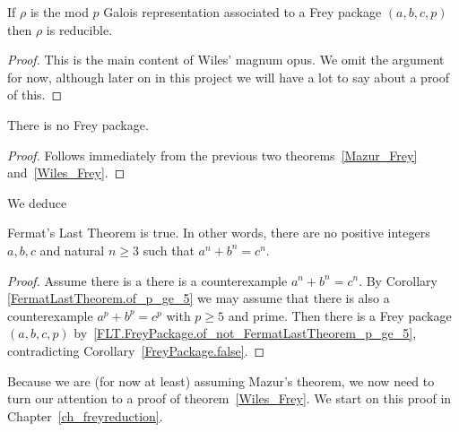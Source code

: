 \begin{theorem}
  \label{Wiles_Frey}
  \leanok
  If $\rho$ is the mod $p$ Galois representation associated to a Frey package $(a,b,c,p)$ then
  $\rho$ is reducible.
\end{theorem}
\begin{proof}
  This is the main content of Wiles' magnum opus.
  We omit the argument for now, although later on in this project
  we will have a lot to say about a proof of this.
\end{proof}

\begin{corollary}
  \label{FreyPackage.false}
  \leanok
  There is no Frey package.
\end{corollary}
\begin{proof}\leanok Follows immediately from the previous two
  theorems~\ref{Mazur_Frey} and~\ref{Wiles_Frey}.
\end{proof}

We deduce

\begin{corollary}
  \label{FLT}
  \leanok
  Fermat's Last Theorem is true. In other words, there are no positive integers $a,b,c$ and
  natural $n\geq3$ such that $a^n+b^n=c^n$.
\end{corollary}
\begin{proof}
  \leanok
  Assume there is a there is a counterexample $a^n+b^n=c^n$.
  By Corollary \ref{FermatLastTheorem.of_p_ge_5} we may assume that there is also a counterexample
  $a^p+b^p=c^p$ with $p\geq 5$ and prime.
  Then there is a Frey package $(a,b,c,p)$ by~\ref{FLT.FreyPackage.of_not_FermatLastTheorem_p_ge_5},
  contradicting Corollary~\ref{FreyPackage.false}.
\end{proof}

Because we are (for now at least) assuming Mazur's theorem, we now need to turn our attention
to a proof of theorem~\ref{Wiles_Frey}. We start on this proof in Chapter~\ref{ch_freyreduction}.
